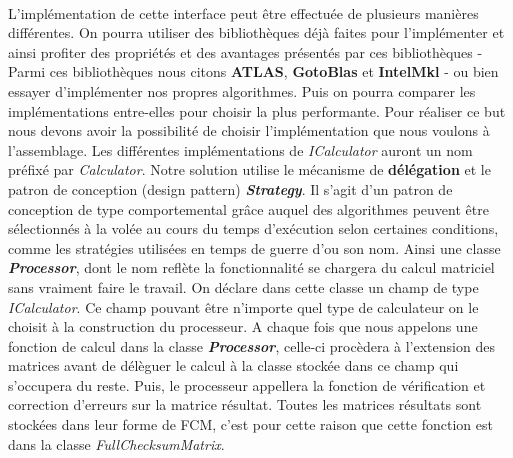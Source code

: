 \documentclass[a4paper,10pt]{report}
\begin{document}
\paragraph*{}
L’implémentation de cette interface peut être effectuée de plusieurs manières différentes. On pourra utiliser 
des bibliothèques déjà faites pour l’implémenter et ainsi profiter des propriétés et des avantages présentés 
par ces bibliothèques - Parmi ces bibliothèques nous citons \textbf{ATLAS}, \textbf{GotoBlas} et \textbf{IntelMkl} - 
ou bien essayer d’implémenter nos propres algorithmes. Puis on pourra comparer les implémentations entre-elles pour choisir 
la plus performante. Pour réaliser ce but nous devons avoir la possibilité de choisir l’implémentation que nous 
voulons à l’assemblage. Les différentes implémentations de \textit{ICalculator} auront un nom préfixé par \textit{Calculator}. 
Notre solution utilise le mécanisme de \textbf{délégation} et le patron de conception (design pattern) \textbf{\textit{Strategy}}. 
Il s’agit d’un patron de conception de type comportemental grâce auquel des algorithmes peuvent être sélectionnés à la 
volée au cours du temps d'exécution selon certaines conditions, comme les stratégies utilisées en temps de guerre d’ou son nom.
\newline
Ainsi une classe \textbf{\textit{Processor}}, dont le nom reflète la fonctionnalité se chargera du calcul matriciel sans vraiment faire 
le travail. On déclare dans cette classe un champ de type \textit{ICalculator}. Ce champ pouvant être n’importe quel 
type de calculateur on le choisit à la construction du processeur. A chaque fois que nous appelons une fonction de calcul 
dans la classe \textbf{\textit{Processor}}, celle-ci procèdera à l'extension des matrices avant de délèguer le calcul à la 
classe stockée dans ce champ qui s’occupera du reste. Puis, le processeur appellera la fonction de vérification et 
correction d’erreurs sur la matrice résultat. Toutes les matrices résultats sont stockées dans leur forme de FCM, 
c’est pour cette raison que cette fonction est dans la classe \textit{FullChecksumMatrix}.
\end{document}
